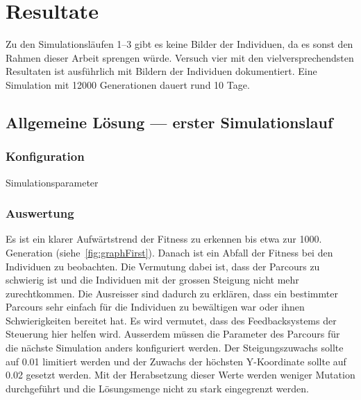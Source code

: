 %
%


\chapter{Resultate\label{chap:Resultate}}

  Zu den Simulationsläufen 1--3 gibt es keine Bilder der Individuen, da es sonst den Rahmen dieser Arbeit sprengen würde.
  Versuch vier mit den vielversprechendsten Resultaten ist ausführlich mit Bildern der Individuen dokumentiert.
  Eine Simulation mit 12000 Generationen dauert rund 10 Tage.

  \section{Allgemeine Lösung --- erster Simulationslauf}

    \subsection{Konfiguration\label{sub:confSecond}}

      \begin{table}[H]
        \centering
        
        \caption{Simulationsparameter}
      \end{table}

    \subsection{Auswertung}

      Es ist ein klarer Aufwärtstrend der Fitness zu erkennen bis etwa zur 1000. Generation (siehe~\vref{fig:graphFirst}).
      Danach ist ein Abfall der Fitness bei den Individuen zu beobachten.
      Die Vermutung dabei ist,
      dass der Parcours zu schwierig ist und die Individuen mit der grossen Steigung nicht mehr zurechtkommen.
      Die Ausreisser sind dadurch zu erklären,
      dass ein bestimmter Parcours sehr einfach für die Individuen zu bewältigen war oder ihnen Schwierigkeiten bereitet hat.
      Es wird vermutet, dass des Feedbacksystems der Steuerung hier helfen wird.
      Ausserdem müssen die Parameter des Parcours für die nächste Simulation anders konfiguriert werden.
      Der Steigungszuwachs sollte auf 0.01 limitiert werden und der Zuwachs der höchsten Y-Koordinate
      sollte auf 0.02 gesetzt werden.
      Mit der Herabsetzung dieser Werte werden weniger Mutation durchgeführt und
      die Lösungsmenge nicht zu stark eingegrenzt werden.

